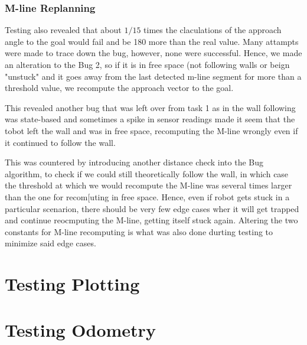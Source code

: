 \documentclass[11pt, a4paper]{article}
\begin{document}
\subsubsection{M-line Replanning}


Testing also revealed that about $1/15$ times the claculations of the approach angle to the goal would 
fail and be 180 \degree more than the real value. Many attampts were made to trace down the bug, however,
none were successful. Hence, we made an alteration to the Bug 2, so if it is in free space (not following 
walls or beign "unstuck"\cite{task1_report} and it goes away from the last detected m-line segment for more
than a threshold value, we recompute the approach vector to the goal.

This revealed another bug that was left over from task 1 as in the wall following was state-based and sometimes
a spike in sensor readings made it seem that the tobot left the wall and was in free space, recomputing the M-line
wrongly even if it continued to follow the wall. 


This was countered by introducing another distance check into the Bug algorithm, to check if we could still 
theoretically follow the wall, in which case the threshold at which we would recompute the M-line was several 
times larger than the one for recom[uting in free space. Hence, even if robot gets stuck in a particular scenarion, 
there should be very few edge cases wher it will get trapped and continue reocmputing the M-line, getting itself stuck again.
Altering the two constants for M-line recomputing is what was also done durting testing to minimize said edge cases.



\section{Testing Plotting}
\label{Testing Plotting}




\section{Testing Odometry}
\label{Testing Odometry}


\end{document}
